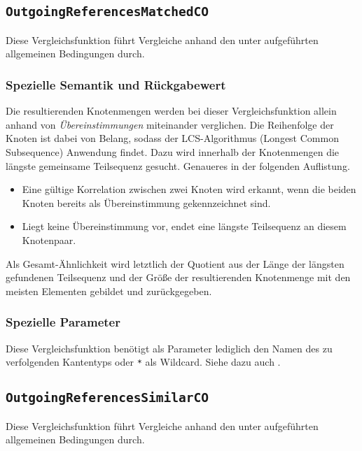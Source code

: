 \newpage
%
%
\subsection{\texttt{OutgoingReferencesMatchedCO}}
Diese Vergleichsfunktion führt Vergleiche anhand den unter\mylinebreak{} aufgeführten allgemeinen Bedingungen durch.

\subsubsection*{Spezielle Semantik und Rückgabewert}
Die resultierenden Knotenmengen werden bei dieser Vergleichsfunktion allein anhand von \emph{Übereinstimmungen} miteinander verglichen. Die Reihenfolge der Knoten ist dabei von Belang, sodass der LCS-Algorithmus (Longest Common Subsequence) Anwendung findet. Dazu wird innerhalb der Knotenmengen die längste gemeinsame Teilsequenz gesucht. Genaueres in der folgenden Auflistung.
\begin{itemize}
	\item Eine gültige Korrelation zwischen zwei Knoten wird erkannt, wenn die beiden Knoten bereits als Übereinstimmung gekennzeichnet sind.
	\item Liegt keine Übereinstimmung vor, endet eine längste Teilsequenz an diesem Knotenpaar.
\end{itemize}

Als Gesamt-Ähnlichkeit wird letztlich der Quotient aus der Länge der längsten gefundenen Teilsequenz und der Größe der resultierenden Knotenmenge mit den meisten Elementen gebildet und zurückgegeben.

\subsubsection*{Spezielle Parameter}
Diese Vergleichsfunktion benötigt als Parameter lediglich den Namen des zu verfolgenden Kantentyps oder \texttt{*} als Wildcard. Siehe dazu auch .


%
%
\subsection{\texttt{OutgoingReferencesSimilarCO}}
Diese Vergleichsfunktion führt Vergleiche anhand den unter\mylinebreak{} aufgeführten allgemeinen Bedingungen durch.

